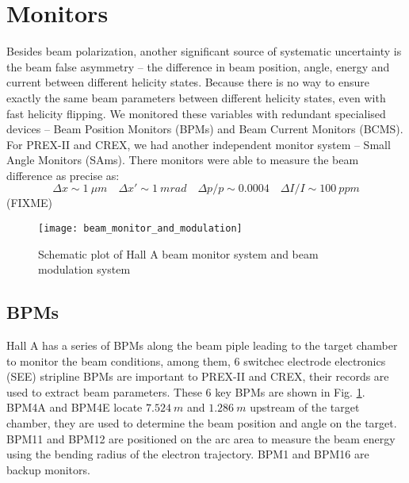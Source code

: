 \section{Monitors}
Besides beam polarization, another significant source of systematic uncertainty
is the beam false asymmetry -- the difference in beam position, angle, energy and
current between different helicity states. Because there is no way to ensure
exactly the same beam parameters between different helicity states, even with fast
helicity flipping. We monitored these variables with redundant specialised devices
-- Beam Position Monitors (BPMs) and Beam Current Monitors (BCMS). For PREX-II
and CREX, we had another independent monitor system -- Small Angle Monitors (SAms).
There monitors were able to measure the beam difference as precise as:
$$ \Delta x \sim 1\ \mu m \quad \Delta x' \sim 1\ mrad \quad \Delta p/p \sim 0.0004 \quad \Delta I/I \sim 100 \ ppm$$ (FIXME)
\begin{figure}[h!]
    \centering
    \texttt{[image: beam\_monitor\_and\_modulation]}
    \caption{Schematic plot of Hall A beam monitor system and beam modulation system}
    \label{fig:hall_a_monitors_and_modulation}
\end{figure}

\subsection{BPMs}
\begin{comment}
Cross check, and unfold beam fluctuation noise from instrumentation noise
\end{comment}
Hall A has a series of BPMs along the beam piple leading to the target chamber
to monitor the beam conditions, among them, 6 switchec electrode electronics (SEE) 
stripline BPMs are important to PREX-II and CREX, 
their records are used to extract beam parameters. These 6
key BPMs are shown in Fig. \ref{fig:hall_a_monitors_and_modulation}. 
BPM4A and BPM4E locate $7.524\ m$ and $1.286\ m$ upstream of the target chamber, 
they are used to determine the beam position and angle on the target. BPM11 and BPM12
are positioned on the arc area to measure the beam energy using the bending 
radius of the electron trajectory. BPM1 and BPM16 are backup monitors.

